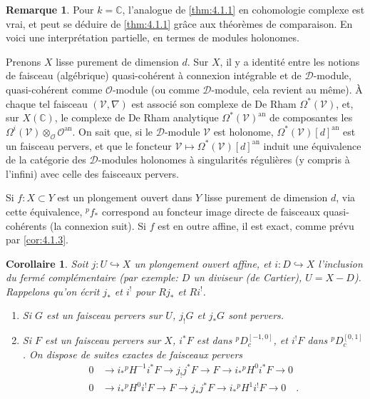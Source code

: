\documentclass[12pt,a4paper]{article}
\theoremstyle{plain}
\newtheorem{corollary}[theorem]{Corollaire}
\theoremstyle{definition}
\newtheorem{remark}[theorem]{Remarque}
\newcommand{\cO}{\mathcal{O}}
\newcommand{\into}{\hookrightarrow}
\providecommand{\cO}{\mathcal{O}}
\begin{document}
\begin{remark}\label{rem:4.1.9}
Pour $k = \mathbb{C}$, l'analogue de \ref{thm:4.1.1} en cohomologie complexe est vrai, et peut se d\'{e}duire de \ref{thm:4.1.1} gr\^{a}ce aux th\'{e}or\`{e}mes de comparaison. En voici une interpr\'{e}tation partielle, en termes de modules holonomes.

Prenons $X$ lisse purement de dimension $d$. Sur $X$, il y a identit\'{e} entre les notions de faisceau (alg\'{e}brique) quasi-coh\'{e}rent \`{a} connexion int\'{e}grable et de $\mathcal{D}$-module, quasi-coh\'{e}rent comme $\cO$-module (ou comme $\mathcal{D}$-module, cela revient au m\^{e}me). \`{A} chaque tel faisceau $(\mathcal{V}, \nabla)$ est associ\'{e} son complexe de De Rham $\Omega^{*}(\mathcal{V})$, et, sur $X(\mathbb{C})$, le complexe de De Rham analytique $\Omega^{*}(\mathcal{V})^{\mathrm{an}}$ de composantes les $\Omega^{i}(\mathcal{V}) \otimes_{\cO} \cO^{\mathrm{an}}$. On sait que, si le $\mathcal{D}$-module $\mathcal{V}$ est holonome, $\Omega^{*}(\mathcal{V})[d]^{\mathrm{an}}$ est un faisceau pervers, et que le foncteur $\mathcal{V} \mapsto \Omega^{*}(\mathcal{V})[d]^{\mathrm{an}}$ induit une \'{e}quivalence de la cat\'{e}gorie des $\mathcal{D}$-modules holonomes \`{a} singularit\'{e}s r\'{e}guli\`{e}res (y compris \`{a} l'infini) avec celle des faisceaux pervers.

Si $f: X \subset Y$ est un plongement ouvert dans $Y$ lisse purement de dimension $d$, via cette \'{e}quivalence, ${}^{p}f_{*}$ correspond au foncteur image directe de faisceaux quasi-coh\'{e}rents (la connexion suit). Si $f$ est en outre affine, il est exact, comme pr\'{e}vu par \ref{cor:4.1.3}.
\end{remark}

\begin{corollary}\label{cor:4.1.10}
Soit $j: U \into X$ un plongement ouvert affine, et $i: D \into X$ l'inclusion du ferm\'{e} compl\'{e}mentaire (par exemple: $D$ un diviseur (de Cartier), $U = X-D$). Rappelons qu'on \'{e}crit $j_{*}$ et $i^{!}$ pour $Rj_{*}$ et $Ri^{!}$.
\begin{enumerate}
\item[(i)] Si $G$ est un faisceau pervers sur $U$, $j_{!}G$ et $j_{*}G$ sont pervers.
\item[(ii)] Si $F$ est un faisceau pervers sur $X$, $i^{*}F$ est dans ${}^{p}D_{c}^{[-1,0]}$, et $i^{!}F$ dans ${}^{p}D_{c}^{[0,1]}$. On dispose de suites exactes de faisceaux pervers
\begin{align}
0 &\to i_{*}{}^{p}H^{-1}i^{*}F \to j_{!}j^{*}F \to F \to i_{*}{}^{p}H^{0}i^{*}F \to 0 \label{eq:4.1.10.1}\\
0 &\to i_{*}{}^{p}H^{0}i^{!}F \to F \to j_{*}j^{*}F \to i_{*}{}^{p}H^{1}i^{!}F \to 0\quad. \label{eq:4.1.10.2}
\end{align}
\end{enumerate}
\end{corollary}
\end{document}
